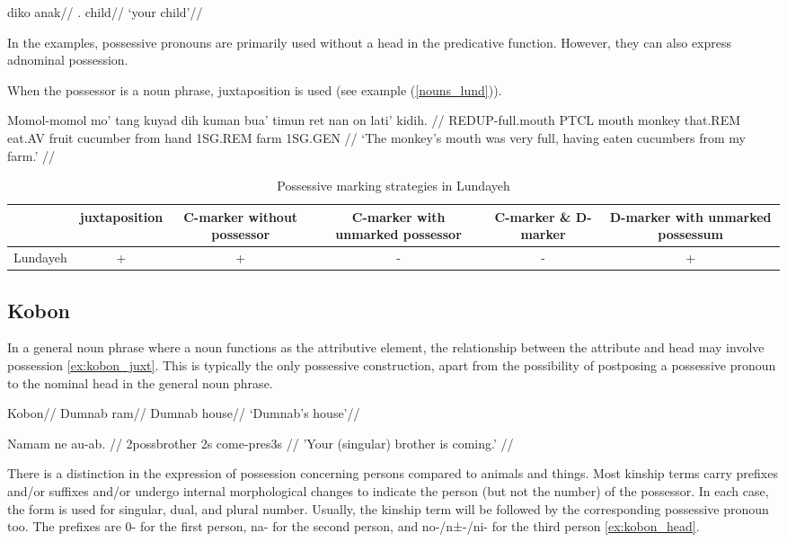 \a
\begingl
\gla diko anak//
\glb \Ssg.\Poss{} child//
\glft `your child'//
\endgl
\xe

In the examples, possessive pronouns are primarily used without a head in the predicative function. However, they can also express adnominal possession.

When the possessor is a noun phrase, juxtaposition is used (see example (\ref{nouns_lund})).

\ex\label{nouns_lund}
\begingl
\gla Momol-momol mo’ tang kuyad dih kuman bua’ timun ret nan on lati’ kidih. //
\glb REDUP-full.mouth PTCL mouth monkey that.REM eat.AV fruit cucumber from hand 1SG.REM farm 1SG.GEN //
\glft ‘The monkey’s mouth was very full, having eaten cucumbers from my farm.’ //
\endgl
\xe

\begin{table}[h!]
	\centering
	\small
	\begin{tabular}{@{}cccccc@{}}
		\toprule
		& juxtaposition & \parbox{2.5cm}{C-marker without possessor} & \parbox{2.75cm}{C-marker with unmarked possessor} & \parbox{1.75cm}{C-marker \& D-marker} & \parbox{3cm}{D-marker with unmarked possessum} \\ \midrule
		Lundayeh & + & + & - & - & + \\ \bottomrule
	\end{tabular}
	\caption{Possessive marking strategies in Lundayeh}
\end{table}


\subsection{Kobon}

In a general noun phrase where a noun functions as the attributive element, the relationship between the attribute and head may involve possession \ref{ex:kobon_juxt}. This is typically the only possessive construction, apart from the possibility of postposing a possessive pronoun to the nominal head in the general noun phrase.

\pex 
\a\label{ex:kobon_juxt}
\begingl
\glpreamble Kobon//
\gla Dumnab ram//
\glb Dumnab house//
\glft `Dumnab's house'//
\endgl

\a\label{ex:kobon_head}
\begingl
\gla Namam ne au-ab. //
\glb 2possbrother 2s come-pres3s //
\glft 'Your (singular) brother is coming.' //
\endgl
\xe

There is a distinction in the expression of possession concerning persons compared to animals and things. Most kinship terms carry prefixes and/or suffixes and/or undergo internal morphological changes to indicate the person (but not the number) of the possessor. In each case, the form is used for singular, dual, and plural number. Usually, the kinship term will be followed by the corresponding possessive pronoun too. The prefixes are 0- for the first person, na- for the second person, and no-/n±-/ni- for the third person \ref{ex:kobon_head}.


